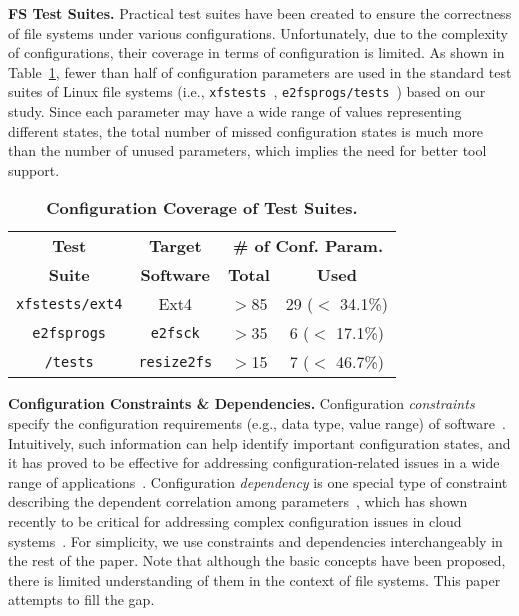 \smallskip
\noindent
\textbf{FS Test Suites.}  
Practical test suites have been created to ensure the correctness of file systems under various configurations. Unfortunately, 
due to the complexity  of configurations, their coverage in terms of configuration is limited. As shown in Table~\ref{tab:testsuites},
fewer than half of configuration parameters are used in  the standard test suites of Linux file systems (i.e., \texttt{xfstests}~\cite{xfstest}, \texttt{e2fsprogs/tests}~\cite{e2fsprogs-test}) based on our study.
Since each parameter may have a wide range of values representing different states, the total number of 
missed configuration states is much more than the number of unused  parameters, which implies the need for better tool support.


\begin{table}[t]
	\small
	\begin{center}
		\begin{tabular}{ c | c | c | c  }
			\textbf{Test} & \textbf{Target} &  \multicolumn{2}{c}{\textbf{\# of Conf. Param.}}  \\
			\cline{3-4}
			\textbf{Suite} & \textbf{Software} & \textbf{Total} & \textbf{Used}  \\
			\hline
			\texttt{xfstests/ext4} & 	{Ext4} & $>$85 & 29 ($<$ 34.1\%)   \\
			\hline
			\texttt{e2fsprogs} & \texttt{e2fsck} & $>$35 & 6 ($<$ 17.1\%)  \\
		     	\texttt{/tests} & \texttt{resize2fs}  & $>$15 & 7 ($<$ 46.7\%)  \\
			\hline
		\end{tabular}
	\end{center}
 
	\caption{ {\bf Configuration Coverage of Test Suites.} 
	}
 	 \vspace{-0.1in}
	\label{tab:testsuites}
\end{table}


\smallskip
\noindent
\textbf{Configuration Constraints \& Dependencies.}
 Configuration \emph{constraints}  specify the configuration requirements (e.g., data type,  value range) of software~\cite{spex}. Intuitively, such information can help identify important configuration states, and it has proved to be effective for addressing  configuration-related  issues in a wide range of applications~\cite{cdep,Conferr-DSN08,spex,AnEmpiricalStudy, ConfigEverywhere-DongpuJin-ICSE14}. 
Configuration \emph{dependency} is one special type of constraint describing the dependent correlation among parameters~\cite{cdep,spex}, which has shown recently to be critical for addressing complex configuration issues in cloud systems~\cite{cdep}.
For simplicity, we use constraints and dependencies interchangeably in the rest of the paper.
Note that although the basic concepts have been proposed, 
there is limited understanding of them in the context of file systems. 
This paper attempts to fill the gap.


